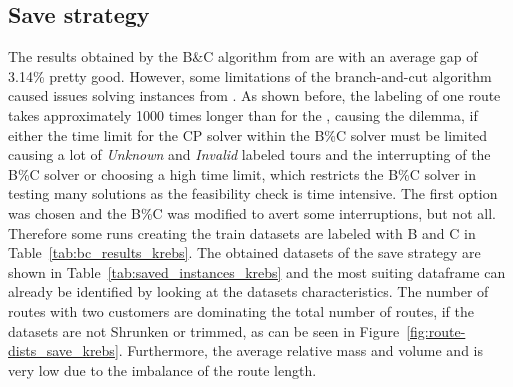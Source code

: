\subsection{Save strategy}
\label{subsec:challenges_krebs_save}

The results obtained by the B\&C algorithm from \cite{tamke_branch-and-cut_2024} are with an average gap of 3.14\% pretty good. However, some limitations
of the branch-and-cut algorithm caused issues solving instances from \krebsADataSet. As shown before, the labeling of one route takes approximately
1000 times longer than for the \gendreauDataSet, causing the dilemma, if either the time limit for the \gls{CP} solver within the B\%C solver
must be limited causing a lot of \textit{Unknown} and \textit{Invalid} labeled tours and the interrupting of the B\%C solver or choosing
a high time limit, which restricts the B\%C solver in testing many solutions as the feasibility check is time intensive. The first option
was chosen and the B\%C was modified to avert some interruptions, but not all. Therefore some runs creating the train datasets are labeled with
B and C in Table~\ref{tab:bc_results_krebs}. The obtained datasets of the save strategy are shown in Table~\ref{tab:saved_instances_krebs}
and the most suiting dataframe can already be identified by looking at the datasets characteristics. The number of routes with two customers
are dominating the total number of routes, if the datasets are not Shrunken or trimmed, as can be seen in Figure~\ref{fig:route-dists_save_krebs}. Furthermore, the average relative mass and volume and
is very low due to the imbalance of the route length.

